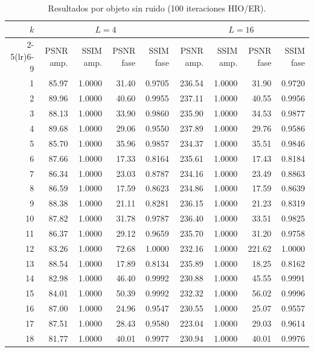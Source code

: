 \documentclass[11pt,a4paper]{article}
\newcommand{\hio}{\textsc{HIO}}
\newcommand{\er}{\textsc{ER}}
\begin{document}
\begin{table}[H]
\centering
\scriptsize
\setlength{\tabcolsep}{4pt}
\caption{Resultados por objeto sin ruido (100 iteraciones \hio{}/\er{}).}
\label{tab:por-imagen-sin-ruido}
\begin{tabular}{r r r r r r r r r}
\toprule
$k$ & \multicolumn{4}{c}{$L=4$} & \multicolumn{4}{c}{$L=16$}\\
\cmidrule(lr){2-5}\cmidrule(lr){6-9}
 & PSNR amp. & SSIM amp. & PSNR fase & SSIM fase & PSNR amp. & SSIM amp. & PSNR fase & SSIM fase\\
\midrule
1 & 85.97 & 1.0000 & 31.40 & 0.9705 & 236.54 & 1.0000 & 31.90 & 0.9720 \\
2 & 89.96 & 1.0000 & 40.60 & 0.9955 & 237.11 & 1.0000 & 40.55 & 0.9956 \\
3 & 88.13 & 1.0000 & 33.90 & 0.9860 & 235.90 & 1.0000 & 34.53 & 0.9877 \\
4 & 89.68 & 1.0000 & 29.06 & 0.9550 & 237.89 & 1.0000 & 29.76 & 0.9586 \\
5 & 85.70 & 1.0000 & 35.96 & 0.9857 & 234.37 & 1.0000 & 35.51 & 0.9846 \\
6 & 87.66 & 1.0000 & 17.33 & 0.8164 & 235.61 & 1.0000 & 17.43 & 0.8184 \\
7 & 86.34 & 1.0000 & 23.03 & 0.8787 & 234.16 & 1.0000 & 23.49 & 0.8863 \\
8 & 86.59 & 1.0000 & 17.59 & 0.8623 & 234.86 & 1.0000 & 17.59 & 0.8639 \\
9 & 88.38 & 1.0000 & 21.11 & 0.8281 & 236.15 & 1.0000 & 21.23 & 0.8319 \\
10 & 87.82 & 1.0000 & 31.78 & 0.9787 & 236.40 & 1.0000 & 33.51 & 0.9825 \\
11 & 86.37 & 1.0000 & 29.12 & 0.9659 & 235.70 & 1.0000 & 31.20 & 0.9758 \\
12 & 83.26 & 1.0000 & 72.68 & 1.0000 & 232.16 & 1.0000 & 221.62 & 1.0000 \\
13 & 88.54 & 1.0000 & 17.89 & 0.8134 & 235.89 & 1.0000 & 18.25 & 0.8162 \\
14 & 82.98 & 1.0000 & 46.40 & 0.9992 & 230.88 & 1.0000 & 45.55 & 0.9991 \\
15 & 84.01 & 1.0000 & 50.39 & 0.9992 & 232.32 & 1.0000 & 56.02 & 0.9996 \\
16 & 87.00 & 1.0000 & 24.96 & 0.9547 & 230.55 & 1.0000 & 25.07 & 0.9557 \\
17 & 87.51 & 1.0000 & 28.43 & 0.9580 & 223.04 & 1.0000 & 29.03 & 0.9614 \\
18 & 81.77 & 1.0000 & 40.01 & 0.9977 & 230.94 & 1.0000 & 40.01 & 0.9976 \\

\end{tabular}
\end{table}
\end{document}
